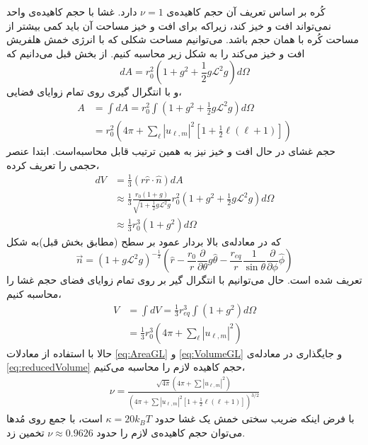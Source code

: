 
 کُره‌ بر اساس تعریف آن حجم کاهیده‌ی 
 $\nu=1$
 دارد. غشا با حجم کاهیده‌ی واحد نمی‌تواند افت و خیز کند، زیراکه برای افت و خیز مساحت آن باید کمی بیشتر از مساحت کُره با همان حجم باشد. می‌توانیم مساحت شکلی که با انرژی خمش هلفریش افت و خیز می‌کند را به شکل زیر محاسبه کنیم. از بخش قبل می‌دانیم که
\begin{equation}
dA=r_{0}^2(1+g^2+\frac{1}{2}g\mathcal{L}^2g)d\Omega
\label{eq:areaPatchDifferential}
\end{equation}
 و با انتگرال گیری روی تمام زوایای فضایی،
 \begin{equation}
\begin{aligned}
A&=\int dA=r_{0}^2\int(1+g^2+\frac{1}{2}g\mathcal{L}^2g)d\Omega\\
&=r_{0}^2(4\pi+\sum_{\ell}|u_{\ell,m}|^2[1+\frac{1}{2}\ell(\ell+1)])
\label{eq:AreaGL}
\end{aligned}
\end{equation}
 حجم غشای در حال افت و خیز نیز به همین ترتیب قابل محاسبه‌است. ابتدا عنصر حجمی را تعریف کرده،
 \begin{equation}
\begin{aligned}
dV&=\frac{1}{3}(r\hat r\cdot\hat n)dA\\
&\approx\frac{1}{3}\frac{r_{0}(1+g)}{\sqrt{1+\frac{1}{2}g\mathcal{L}^2g}}r_{0}^2(1+g^2+\frac{1}{2}g\mathcal{L}^2g)d\Omega\\
&\approx\frac{1}{3}r_{0}^3(1+g^2)d\Omega
\label{eq:volumeDifferential}
\end{aligned}
\end{equation}
 که در معادله‌ی بالا بردار عمود بر سطح (مطابق بخش قبل)به شکل
 \begin{equation}
\vec n =\left(1+g\mathcal{L}^2g\right)^{-\frac{1}{2}}(\hat r-\frac{r_0}{r}\frac{\partial}{\partial\theta}g\hat\theta-\frac{r_{eq}}{r}\frac{1}{\sin\theta}\frac{\partial}{\partial\phi}\hat\phi)
\label{eq:surfaceNormal}
\end{equation}
تعریف شده است. حال می‌توانیم با انتگرال گیر بر روی تمام زوایای فضای حجم غشا را محاسبه کنیم،
\begin{equation}
\begin{aligned}
V&=\int dV=\frac{1}{3}r_{eq}^3\int(1+g^2)d\Omega\\
&=\frac{1}{3}r_{0}^3(4\pi+\sum_{\ell}|u_{\ell,m}|^2)
\label{eq:VolumeGL}
\end{aligned}
\end{equation}
حالا با استفاده از معادلات
\ref{eq:AreaGL}
و
\ref{eq:VolumeGL}
و جایگذاری در معادله‌ی
\ref{eq:reducedVolume}
حجم کاهیده لازم را محاسبه می‌کنیم،
\begin{equation}
\begin{aligned}
\nu=\frac{\sqrt{4\pi}(4\pi+\sum|u_{\ell,m}|^2)}{(4\pi+\sum|u_{\ell,m}|^2[1+\frac{1}{2}\ell(\ell+1)])^{3/2}}
\label{eq:nuUndulated}
\end{aligned}
\end{equation}
با فرض اینکه ضریب سختی خمش یک غشا حدود
$\kappa=20k_BT$
است، با جمع روی مُدها می‌توان حجم کاهیده‌ی لازم را حدود
$\nu\approx0.9626$
تخمین زد.
